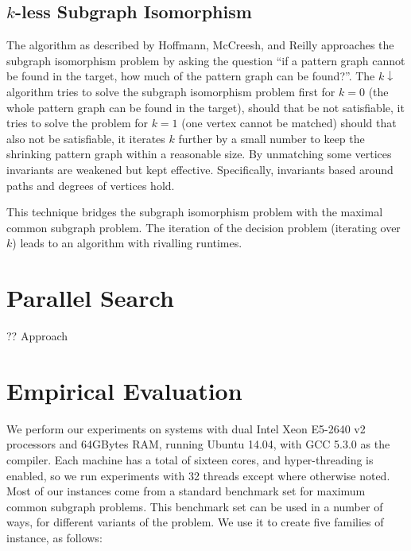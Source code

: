 \documentclass[sigconf]{acmart}
\begin{document}
\subsection{$k$-less Subgraph Isomorphism}

The algorithm as described by Hoffmann, McCreesh, and Reilly \cite{DBLP:conf/aaai/HoffmannMR17} approaches the subgraph isomorphism problem by asking the question ``if a pattern graph cannot be found in the target, how much of the pattern graph can be found?''. The $k{\downarrow}$ algorithm tries to solve the subgraph isomorphism problem first for $k=0$ (the whole pattern graph can be found in the target), should that be not satisfiable, it tries to solve the problem for $k=1$ (one vertex cannot be matched) should that also not be satisfiable, it iterates $k$ further by a small number to keep the shrinking pattern graph within a reasonable size. By unmatching some vertices  invariants are weakened but kept effective. Specifically, invariants based around paths and degrees of vertices hold.

This technique bridges the subgraph isomorphism problem with the maximal common subgraph problem. The iteration of the decision problem (iterating over $k$) leads to an algorithm with rivalling runtimes.

\section{Parallel Search}

?? Approach

\section{Empirical Evaluation}

We perform our experiments on systems with dual Intel Xeon E5-2640 v2 processors and 64GBytes RAM,
running Ubuntu 14.04, with GCC 5.3.0 as the compiler. Each machine has a total of sixteen cores, and
hyper-threading is enabled, so we run experiments with 32 threads except where otherwise noted.
Most of our instances come from a standard benchmark set
\citep{DBLP:journals/prl/SantoFSV03,DBLP:journals/jgaa/ConteFV07} for maximum common subgraph
problems.  This benchmark set can be used in a number of ways, for different variants of the
problem. We use it to create five families of instance, as follows:
\end{document}
